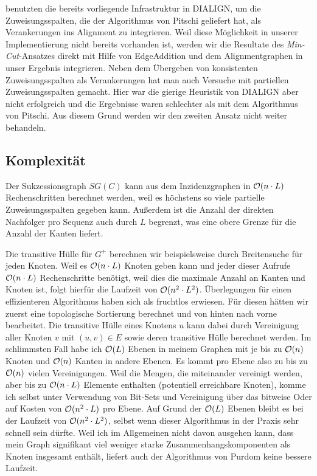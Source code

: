 \cite{cpm10} benutzten die bereits vorliegende Infrastruktur in DIALIGN, um die Zuweisungsspalten, die der Algorithmus von Pitschi geliefert hat, als Verankerungen ins Alignment zu integrieren. Weil diese Möglichkeit in unserer Implementierung nicht bereits vorhanden ist, werden wir die Resultate des \emph{Min-Cut}-Ansatzes direkt mit Hilfe von \textrm{EdgeAddition} und dem Alignmentgraphen in unser Ergebnis integrieren. Neben dem Übergeben von konsistenten Zuweisungsspalten als Verankerungen hat man auch Versuche mit partiellen Zuweisungsspalten gemacht. Hier war die gierige Heuristik von DIALIGN aber nicht erfolgreich und die Ergebnisse waren schlechter als mit dem Algorithmus von Pitschi. Aus diesem Grund werden wir den zweiten Ansatz nicht weiter behandeln.

\subsection{Komplexität}

Der Sukzessionsgraph $SG(C)$ kann aus dem Inzidenzgraphen in $\mathcal{O}(n\cdot L)$ Rechenschritten berechnet werden, weil es höchstens so viele partielle Zuweisungsspalten gegeben kann. Außerdem ist die Anzahl der direkten Nachfolger pro Sequenz auch durch $L$ begrenzt, was eine obere Grenze für die Anzahl der Kanten liefert.

Die transitive Hülle für $G^{+}$ berechnen wir beispielsweise durch Breitensuche für jeden Knoten. Weil es $\mathcal{O}(n\cdot L)$ Knoten geben kann und jeder dieser Aufrufe $\mathcal{O}(n\cdot L)$ Rechenschritte benötigt, weil dies die maximale Anzahl an Kanten und Knoten ist, folgt hierfür die Laufzeit von $\mathcal{O}(n^2\cdot L^2)$. Überlegungen für einen effizienteren Algorithmus haben sich als fruchtlos erwiesen. Für diesen hätten wir zuerst eine topologische Sortierung berechnet und von hinten nach vorne bearbeitet. Die transitive Hülle eines Knotens $u$ kann dabei durch Vereinigung aller Knoten $v$ mit $(u,v) \in E$ sowie deren transitive Hülle berechnet werden. Im schlimmsten Fall habe ich $\mathcal{O}(L)$ Ebenen in meinem Graphen mit je bis zu $\mathcal{O}(n)$ Knoten und $\mathcal{O}(n)$ Kanten in andere Ebenen. Es kommt pro Ebene also zu bis zu $\mathcal{O}(n)$ vielen Vereinigungen. Weil die Mengen, die miteinander vereinigt werden, aber bis zu $\mathcal{O}(n\cdot L)$ Elemente enthalten (potentiell erreichbare Knoten), komme ich selbst unter Verwendung von Bit-Sets und Vereinigung über das bitweise Oder auf Kosten von $\mathcal{O}(n^2\cdot L)$ pro Ebene. Auf Grund der $\mathcal{O}(L)$ Ebenen bleibt es bei der Laufzeit von $\mathcal{O}(n^2\cdot L^2)$, selbst wenn dieser Algorithmus in der Praxis sehr schnell sein dürfte. Weil ich im Allgemeinen nicht davon ausgehen kann, dass mein Graph signifikant viel weniger starke Zusammenhangskomponenten als Knoten insgesamt enthält, liefert auch der Algorithmus von Purdom keine bessere Laufzeit.

